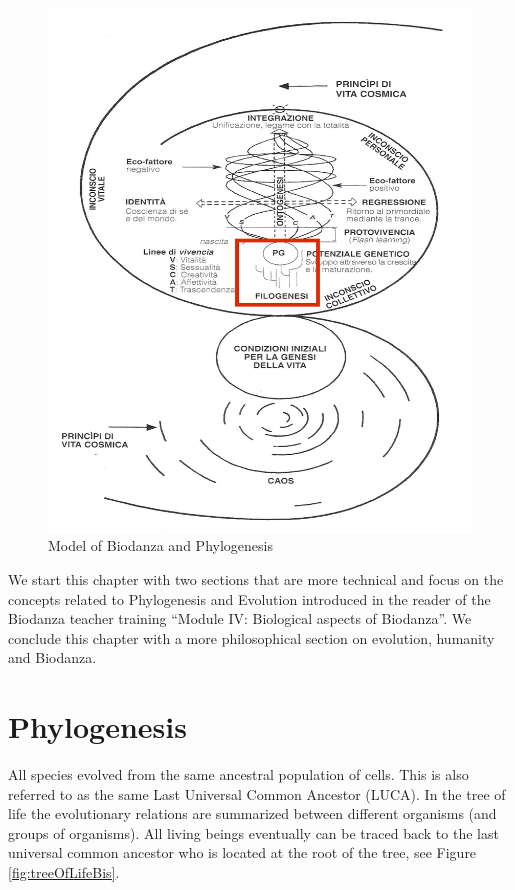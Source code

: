 \documentclass[
  11pt,
]{book}
\begin{document}
\begin{figure}

{\centering \includegraphics[width=0.5\linewidth]{./figs/biologischeAspectenBiodanzaDeelII} 

}

\caption{Model of Biodanza and Phylogenesis}\label{fig:modelPhylo}
\end{figure}

We start this chapter with two sections that are more technical and focus on the concepts related to Phylogenesis and Evolution introduced in the reader of the Biodanza teacher training ``Module IV: Biological aspects of Biodanza''. We conclude this chapter with a more philosophical section on evolution, humanity and Biodanza.

\hypertarget{phylogenesis}{%
\section{Phylogenesis}\label{phylogenesis}}

All species evolved from the same ancestral population of cells.
This is also referred to as the same Last Universal Common Ancestor (LUCA).
In the tree of life the evolutionary relations are summarized between different organisms (and groups of organisms). All living beings eventually can be traced back to the last universal common ancestor who is located at the root of the tree, see Figure \ref{fig:treeOfLifeBis}.
\end{document}
